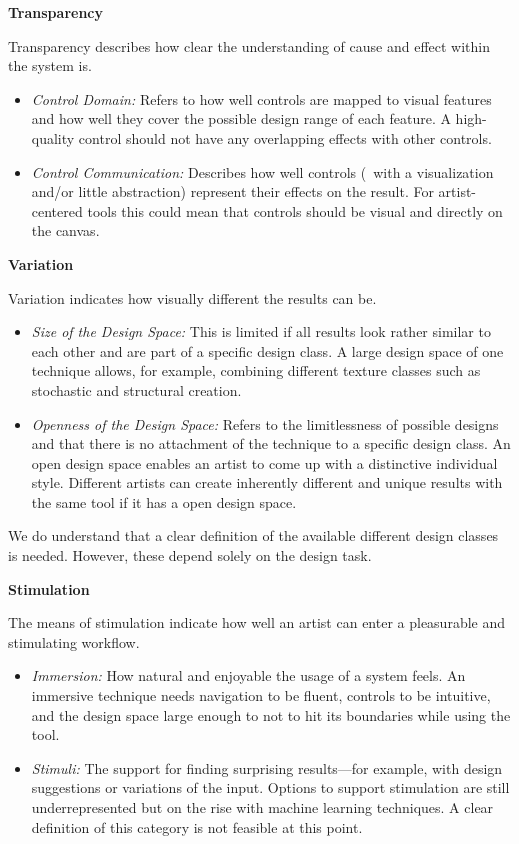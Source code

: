 \noindent\textbf{Transparency}
\label{subsubsec:transparency}

Transparency describes how clear the understanding of cause and effect within the system is.

\begin{itemize}
    \item \textit{Control Domain:} Refers to how well controls are mapped to visual features and how well they cover the possible design range of each feature. A high-quality control should not have any overlapping effects with other controls.
    \item \textit{Control Communication:} Describes how well controls (\eg~with a visualization and/or little abstraction) represent their effects on the result. For artist-centered tools this could mean that controls should be visual and directly on the canvas.
\end{itemize}


\noindent\textbf{Variation}\label{subsubsec:variation}

Variation indicates how visually different the results can be.

\begin{itemize}
    \item \textit{Size of the Design Space:} This is limited if all results look rather similar to each other and are part of a specific design class. A large design space of one technique allows, for example, combining different texture classes such as stochastic and structural creation.
    \item \textit{Openness of the Design Space:} Refers to the limitlessness of possible designs and that there is no attachment of the technique to a specific design class. An open design space enables an artist to come up with a distinctive individual style. Different artists can create inherently different and unique results with the same tool if it has a open design space.
\end{itemize}

We do understand that a clear definition of the available different design classes is needed. However, these depend solely on the design task. 


\noindent\textbf{Stimulation}
\label{subsubsec:stimulation}

The means of stimulation indicate how well an artist can enter a pleasurable and stimulating workflow.
\begin{itemize}
    \item \textit{Immersion:} How natural and enjoyable the usage of a system feels.
    An immersive technique needs navigation to be fluent, controls to be intuitive, and the design space large enough to not to hit its boundaries while using the tool. 
    
    \item \textit{Stimuli:} The support for finding surprising results---for example, with design suggestions or variations of the input. Options to support stimulation are still underrepresented but on the rise with machine learning techniques. A clear definition of this category is not feasible at this point.

\end{itemize}

